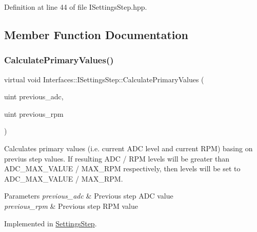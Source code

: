 Definition at line 44 of file I\+Settings\+Step.\+hpp.



\subsection{Member Function Documentation}
\mbox{\label{class_interfaces_1_1_i_settings_step_a04e46c3ebe1f28e0ad0bce23fb863f66}} 
\subsubsection{\texorpdfstring{Calculate\+Primary\+Values()}{CalculatePrimaryValues()}}
{\footnotesize\ttfamily virtual void Interfaces\+::\+I\+Settings\+Step\+::\+Calculate\+Primary\+Values (\begin{DoxyParamCaption}\item[{uint}]{previous\+\_\+adc,  }\item[{uint}]{previous\+\_\+rpm }\end{DoxyParamCaption})\hspace{0.3cm}{\ttfamily [pure virtual]}}



Calculates primary values (i.\+e. current A\+DC level and current R\+PM) basing on previus step values. If resulting A\+DC / R\+PM levels will be greater than A\+D\+C\+\_\+\+M\+A\+X\+\_\+\+V\+A\+L\+UE / M\+A\+X\+\_\+\+R\+PM respectively, then levels will be set to A\+D\+C\+\_\+\+M\+A\+X\+\_\+\+V\+A\+L\+UE / M\+A\+X\+\_\+\+R\+PM. 


\begin{DoxyParams}{Parameters}
{\em previous\+\_\+adc} & Previous step A\+DC value \\
\hline
{\em previous\+\_\+rpm} & Previous step R\+PM value \\
\hline
\end{DoxyParams}


Implemented in \hyperlink{class_settings_step_ac6f79a139ab25cc50ed105f64fc9652f}{Settings\+Step}.

\mbox{\label{class_interfaces_1_1_i_settings_step_ab77c6eaa45707ec4932a8f432b13ad78}} 
